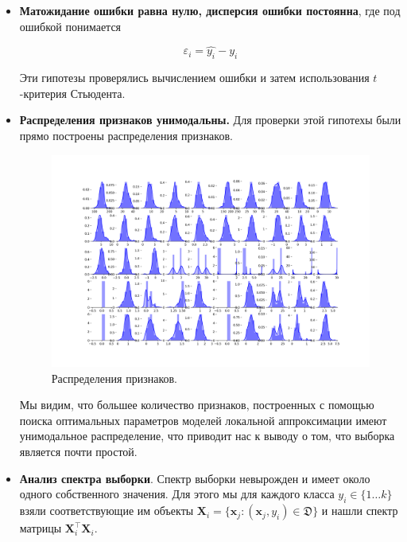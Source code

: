 \documentclass[12pt, fleqn, unicode]{article}
\newcommand{\bx}{\mathbf{x}}
\newcommand{\bX}{\mathbf{X}}
\renewcommand{\eps}{\varepsilon}
\begin{document}
\begin{itemize}
    \item \textbf{Матожидание ошибки равна нулю, дисперсия ошибки постоянна}, где под ошибкой
    понимается

    $$
    \eps_i = \hat{y_i} - y_i
    $$

    Эти гипотезы проверялись вычислением ошибки и затем использования $t$-критерия
    Стьюдента.

    \item \textbf{Распределения признаков унимодальны.} Для проверки этой
    гипотехы были прямо построены распределения признаков.

    \begin{figure}[ht]
        \caption{Распределения признаков.}
        \centering
          \includegraphics[width=\textwidth]{../pics/features_unimodality.png}
    \end{figure}
    Мы видим, что большее количество признаков, построенных с помощью поиска
    оптимальных параметров моделей локальной аппроксимации имеют
    унимодальное распределение, что приводит нас к выводу о том, что
    выборка является почти простой.

    \item \textbf{Анализ спектра выборки}. Спектр выборки невырожден и имеет
    около одного собственного значения. Для этого мы для каждого класса $y_i \in \{1\ldots k\}$
    взяли соответствующие им объекты $\bX_i = \{\bx_j: (\bx_j, y_i) \in
    \mathfrak{D}\}$ и нашли спектр матрицы $\bX_i^\intercal \bX_i$.


\end{itemize}
\end{document}
